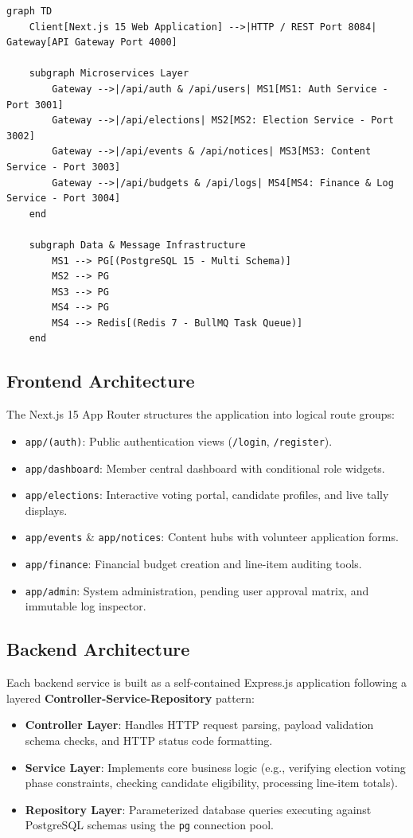 \documentclass[12pt, a4paper]{article}
\begin{document}
\begin{lstlisting}[language=mermaid, caption={High-Level System Architecture Diagram}]
graph TD
    Client[Next.js 15 Web Application] -->|HTTP / REST Port 8084| Gateway[API Gateway Port 4000]
    
    subgraph Microservices Layer
        Gateway -->|/api/auth & /api/users| MS1[MS1: Auth Service - Port 3001]
        Gateway -->|/api/elections| MS2[MS2: Election Service - Port 3002]
        Gateway -->|/api/events & /api/notices| MS3[MS3: Content Service - Port 3003]
        Gateway -->|/api/budgets & /api/logs| MS4[MS4: Finance & Log Service - Port 3004]
    end
    
    subgraph Data & Message Infrastructure
        MS1 --> PG[(PostgreSQL 15 - Multi Schema)]
        MS2 --> PG
        MS3 --> PG
        MS4 --> PG
        MS4 --> Redis[(Redis 7 - BullMQ Task Queue)]
    end
\end{lstlisting}

\subsection{Frontend Architecture}
The Next.js 15 App Router structures the application into logical route groups:
\begin{itemize}
    \item \texttt{app/(auth)}: Public authentication views (\texttt{/login}, \texttt{/register}).
    \item \texttt{app/dashboard}: Member central dashboard with conditional role widgets.
    \item \texttt{app/elections}: Interactive voting portal, candidate profiles, and live tally displays.
    \item \texttt{app/events} \& \texttt{app/notices}: Content hubs with volunteer application forms.
    \item \texttt{app/finance}: Financial budget creation and line-item auditing tools.
    \item \texttt{app/admin}: System administration, pending user approval matrix, and immutable log inspector.
\end{itemize}

\subsection{Backend Architecture}
Each backend service is built as a self-contained Express.js application following a layered \textbf{Controller-Service-Repository} pattern:
\begin{itemize}
    \item \textbf{Controller Layer}: Handles HTTP request parsing, payload validation schema checks, and HTTP status code formatting.
    \item \textbf{Service Layer}: Implements core business logic (e.g., verifying election voting phase constraints, checking candidate eligibility, processing line-item totals).
    \item \textbf{Repository Layer}: Parameterized database queries executing against PostgreSQL schemas using the \texttt{pg} connection pool.
\end{itemize}
\end{document}
